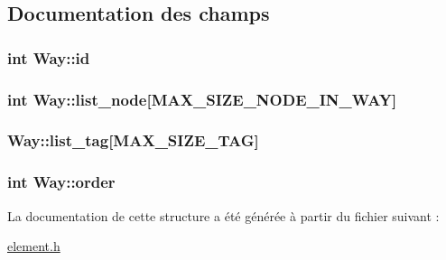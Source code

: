 \subsection{Documentation des champs}
\hypertarget{struct_way_a7c8440a005753c31f2722f98e51b1ce5_a7c8440a005753c31f2722f98e51b1ce5}{
\subsubsection[{id}]{\setlength{\rightskip}{0pt plus 5cm}int Way\-::id}}\label{struct_way_a7c8440a005753c31f2722f98e51b1ce5_a7c8440a005753c31f2722f98e51b1ce5}
\hypertarget{struct_way_a280d1bd29da13eb37744caae33182064_a280d1bd29da13eb37744caae33182064}{
\subsubsection[{list\-\_\-node}]{\setlength{\rightskip}{0pt plus 5cm}int Way\-::list\-\_\-node\mbox{[}{\bf M\-A\-X\-\_\-\-S\-I\-Z\-E\-\_\-\-N\-O\-D\-E\-\_\-\-I\-N\-\_\-\-W\-A\-Y}\mbox{]}}}\label{struct_way_a280d1bd29da13eb37744caae33182064_a280d1bd29da13eb37744caae33182064}
\hypertarget{struct_way_a1aafa2cd308feca6fc6804ea305c70f3_a1aafa2cd308feca6fc6804ea305c70f3}{
\subsubsection[{list\-\_\-tag}]{ Way\-::list\-\_\-tag\mbox{[}{\bf M\-A\-X\-\_\-\-S\-I\-Z\-E\-\_\-\-T\-A\-G}\mbox{]}}}\label{struct_way_a1aafa2cd308feca6fc6804ea305c70f3_a1aafa2cd308feca6fc6804ea305c70f3}
\hypertarget{struct_way_a754a3e559d7f2574bd11c14234a55e50_a754a3e559d7f2574bd11c14234a55e50}{
\subsubsection[{order}]{\setlength{\rightskip}{0pt plus 5cm}int Way\-::order}}\label{struct_way_a754a3e559d7f2574bd11c14234a55e50_a754a3e559d7f2574bd11c14234a55e50}


La documentation de cette structure a été générée à partir du fichier suivant \-:\begin{DoxyCompactItemize}
\item 
\hyperlink{element_8h}{element.\-h}\end{DoxyCompactItemize}
